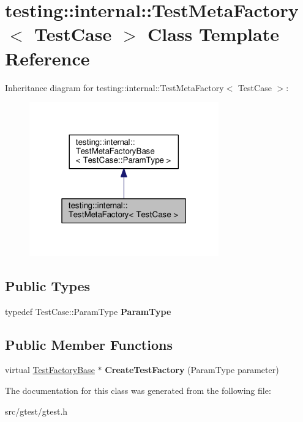 \hypertarget{classtesting_1_1internal_1_1_test_meta_factory}{}\section{testing\+:\+:internal\+:\+:Test\+Meta\+Factory$<$ Test\+Case $>$ Class Template Reference}
\label{classtesting_1_1internal_1_1_test_meta_factory}


Inheritance diagram for testing\+:\+:internal\+:\+:Test\+Meta\+Factory$<$ Test\+Case $>$\+:
\nopagebreak
\begin{figure}[H]
\begin{center}
\leavevmode
\includegraphics[width=232pt]{classtesting_1_1internal_1_1_test_meta_factory__inherit__graph}
\end{center}
\end{figure}
\subsection*{Public Types}
\begin{DoxyCompactItemize}
\item 
\mbox{\label{classtesting_1_1internal_1_1_test_meta_factory_a9c12e442b4389381b948ed669fcf0f84}} 
typedef Test\+Case\+::\+Param\+Type {\bfseries Param\+Type}
\end{DoxyCompactItemize}
\subsection*{Public Member Functions}
\begin{DoxyCompactItemize}
\item 
\mbox{\label{classtesting_1_1internal_1_1_test_meta_factory_ae9f5334c68af309bca8f7ec29d837e38}} 
virtual \mbox{\hyperlink{classtesting_1_1internal_1_1_test_factory_base}{Test\+Factory\+Base}} $\ast$ {\bfseries Create\+Test\+Factory} (Param\+Type parameter)
\end{DoxyCompactItemize}


The documentation for this class was generated from the following file\+:\begin{DoxyCompactItemize}
\item 
src/gtest/gtest.\+h\end{DoxyCompactItemize}
